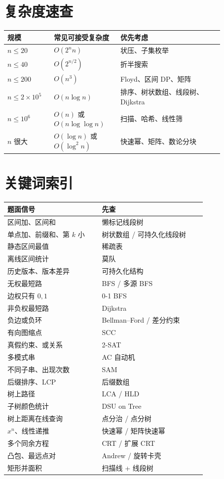 \section{复杂度速查}

\begin{center}
\begin{tabular}{p{0.18\linewidth}|p{0.27\linewidth}|p{0.42\linewidth}}
\textbf{规模} & \textbf{常见可接受复杂度} & \textbf{优先考虑}\\ \hline
\(n\le 20\) & \(O(2^n n)\) & 状压、子集枚举\\
\(n\le 40\) & \(O(2^{n/2})\) & 折半搜索\\
\(n\le 200\) & \(O(n^3)\) & Floyd、区间 DP、矩阵\\
\(n\le 2\times 10^5\) & \(O(n\log n)\) & 排序、树状数组、线段树、Dijkstra\\
\(n\le 10^6\) & \(O(n)\) 或 \(O(n\log\log n)\) & 扫描、哈希、线性筛\\
\(n\) 很大 & \(O(\log n)\) 或 \(O(\log^2 n)\) & 快速幂、矩阵、数论分块
\end{tabular}
\end{center}

\section{关键词索引}

\begin{tabular}{p{0.38\linewidth}|p{0.42\linewidth}}
\textbf{题面信号} & \textbf{先查}\\ \hline
区间加、区间和 & 懒标记线段树\\
单点加、前缀和、第 \(k\) 小 & 树状数组 / 可持久化线段树\\
静态区间最值 & 稀疏表\\
离线区间统计 & 莫队\\
历史版本、版本差异 & 可持久化结构\\
无权最短路 & BFS / 多源 BFS\\
边权只有 \(0,1\) & 0-1 BFS\\
非负权最短路 & Dijkstra\\
负边或负环 & Bellman--Ford / 差分约束\\
有向图缩点 & SCC\\
真假约束、或关系 & 2-SAT\\
多模式串 & AC 自动机\\
不同子串、出现次数 & SAM\\
后缀排序、LCP & 后缀数组\\
树上路径 & LCA / HLD\\
子树颜色统计 & DSU on Tree\\
树上距离在线查询 & 点分治 / 点分树\\
\(x^n\)、线性递推 & 快速幂 / 矩阵快速幂\\
多个同余方程 & CRT / 扩展 CRT\\
凸包、最远点对 & Andrew / 旋转卡壳\\
矩形并面积 & 扫描线 + 线段树
\end{tabular}

